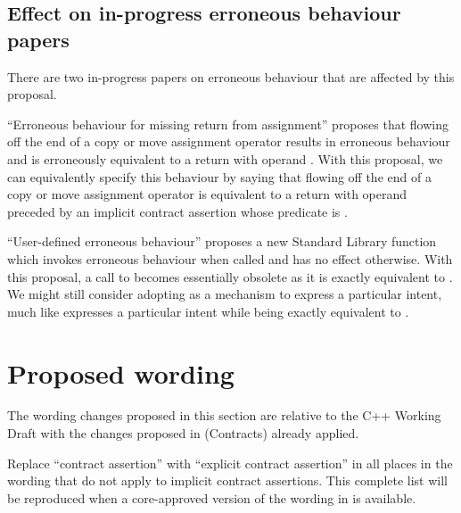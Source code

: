 \subsection{Effect on in-progress erroneous behaviour papers}

There are two in-progress papers on erroneous behaviour that are affected by this proposal.

\cite{P2973R0} ``Erroneous behaviour for missing return from assignment'' proposes that flowing off the end of a copy or move assignment operator results in erroneous behaviour and is erroneously equivalent to a return with operand . With this proposal, we can equivalently specify this behaviour by saying that flowing off the end of a copy or move assignment operator is equivalent to a return with operand  preceded by an implicit contract assertion whose predicate is .

\cite{P3232R1} ``User-defined erroneous behaviour'' proposes a new Standard Library function  which invokes erroneous behaviour when called and has no effect otherwise. With this proposal, a call to  becomes essentially obsolete as it is exactly equivalent to \mbox{}. We might still consider adopting  as a mechanism to express a particular intent, much like  expresses a particular intent while being exactly equivalent to \mbox{}.


\section{Proposed wording}

The wording changes proposed in this section are relative to the C++ Working Draft \cite{N5001} with the changes proposed in \cite{P2900R13} (Contracts) already applied. 


Replace ``contract assertion'' with ``explicit contract assertion'' in all places in the wording that do not apply to implicit contract assertions.  This complete list will be reproduced when a core-approved version of the wording in \cite{P2900R13} is available.

